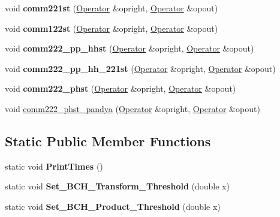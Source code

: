 \begin{DoxyCompactItemize}
\item 
\hypertarget{classOperator_a4d68427f2033c9e25c46674e555e05d2}{void {\bfseries comm221st} (\hyperlink{classOperator}{Operator} \&opright, \hyperlink{classOperator}{Operator} \&opout)}\label{classOperator_a4d68427f2033c9e25c46674e555e05d2}

\item 
\hypertarget{classOperator_ac7b9d8a707c3cfc953f070967704835e}{void {\bfseries comm122st} (\hyperlink{classOperator}{Operator} \&opright, \hyperlink{classOperator}{Operator} \&opout)}\label{classOperator_ac7b9d8a707c3cfc953f070967704835e}

\item 
\hypertarget{classOperator_a6b1dec40442bf3f9ebe0dbc52bc2d241}{void {\bfseries comm222\-\_\-pp\-\_\-hhst} (\hyperlink{classOperator}{Operator} \&opright, \hyperlink{classOperator}{Operator} \&opout)}\label{classOperator_a6b1dec40442bf3f9ebe0dbc52bc2d241}

\item 
\hypertarget{classOperator_a850ad8c78ae948a6243e6041eaee5b64}{void {\bfseries comm222\-\_\-pp\-\_\-hh\-\_\-221st} (\hyperlink{classOperator}{Operator} \&opright, \hyperlink{classOperator}{Operator} \&opout)}\label{classOperator_a850ad8c78ae948a6243e6041eaee5b64}

\item 
\hypertarget{classOperator_a0f3ee31f13fff9cb88e0e107e2acdf8a}{void {\bfseries comm222\-\_\-phst} (\hyperlink{classOperator}{Operator} \&opright, \hyperlink{classOperator}{Operator} \&opout)}\label{classOperator_a0f3ee31f13fff9cb88e0e107e2acdf8a}

\item 
void \hyperlink{classOperator_a896cd6f88a45ae1a41b9a667d1a70202}{comm222\-\_\-phst\-\_\-pandya} (\hyperlink{classOperator}{Operator} \&opright, \hyperlink{classOperator}{Operator} \&opout)
\end{DoxyCompactItemize}
\subsection*{Static Public Member Functions}
\begin{DoxyCompactItemize}
\item 
\hypertarget{classOperator_aa8280e8e2c6be73a9594789127b939c1}{static void {\bfseries Print\-Times} ()}\label{classOperator_aa8280e8e2c6be73a9594789127b939c1}

\item 
\hypertarget{classOperator_a6f505221635444cb0b489b9ac600fd61}{static void {\bfseries Set\-\_\-\-B\-C\-H\-\_\-\-Transform\-\_\-\-Threshold} (double x)}\label{classOperator_a6f505221635444cb0b489b9ac600fd61}

\item 
\hypertarget{classOperator_a2c42843a1a557f2ab568d106e8fd23e8}{static void {\bfseries Set\-\_\-\-B\-C\-H\-\_\-\-Product\-\_\-\-Threshold} (double x)}\label{classOperator_a2c42843a1a557f2ab568d106e8fd23e8}

\end{DoxyCompactItemize}
